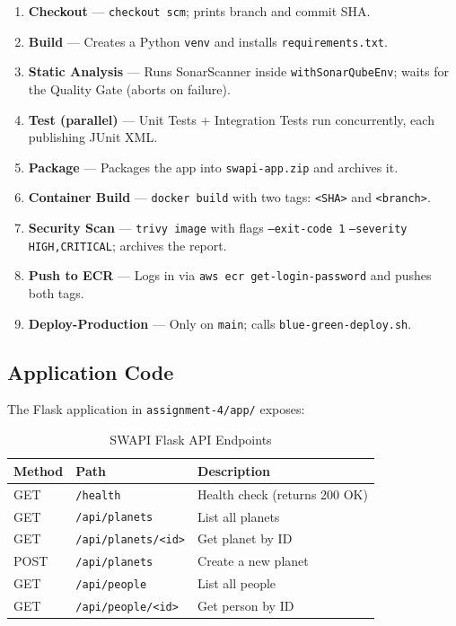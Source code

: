 \documentclass[12pt,a4paper]{article}
\begin{document}
\begin{enumerate}[leftmargin=*]
  \item \textbf{Checkout} — \texttt{checkout scm}; prints branch and commit SHA.
  \item \textbf{Build} — Creates a Python \texttt{venv} and installs \texttt{requirements.txt}.
  \item \textbf{Static Analysis} — Runs SonarScanner inside \texttt{withSonarQubeEnv}; waits for the Quality Gate (aborts on failure).
  \item \textbf{Test (parallel)} — Unit Tests + Integration Tests run concurrently, each publishing JUnit XML.
  \item \textbf{Package} — Packages the app into \texttt{swapi-app.zip} and archives it.
  \item \textbf{Container Build} --- \texttt{docker build} with two tags: \texttt{<SHA>} and \texttt{<branch>}.
  \item \textbf{Security Scan} --- \texttt{trivy image} with flags \texttt{--exit-code 1} \texttt{--severity HIGH,CRITICAL}; archives the report.
  \item \textbf{Push to ECR} — Logs in via \texttt{aws ecr get-login-password} and pushes both tags.
  \item \textbf{Deploy-Production} — Only on \texttt{main}; calls \texttt{blue-green-deploy.sh}.
\end{enumerate}

\subsection{Application Code}

The Flask application in \texttt{assignment-4/app/} exposes:

\begin{table}[H]
  \centering
  \caption{SWAPI Flask API Endpoints}
  \label{tab:endpoints}
  \begin{tabularx}{\linewidth}{llX}
    \toprule
    \textbf{Method} & \textbf{Path} & \textbf{Description} \\
    \midrule
    GET  & \texttt{/health}              & Health check (returns 200 OK) \\
    GET  & \texttt{/api/planets}         & List all planets \\
    GET  & \texttt{/api/planets/<id>}    & Get planet by ID \\
    POST & \texttt{/api/planets}         & Create a new planet \\
    GET  & \texttt{/api/people}          & List all people \\
    GET  & \texttt{/api/people/<id>}     & Get person by ID \\
    \bottomrule
  \end{tabularx}
\end{table}
\end{document}
